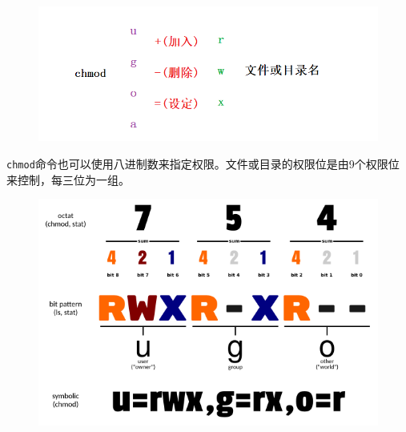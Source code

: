 \documentclass[12pt, openany, oneside]{book}
\begin{document}
\begin{figure}[H]
    \centering
    \includegraphics[scale=0.6]{img/C5/5-2/3.png}
\end{figure}

\begin{table}[H]
    \centering
    \caption{\lstinline|chmod|参数说明}
\end{table}

\lstinline|chmod|命令也可以使用八进制数来指定权限。文件或目录的权限位是由9个权限位来控制，每三位为一组。

\begin{figure}[H]
    \centering
    \includegraphics[scale=0.8]{img/C5/5-2/4.png}
\end{figure}
\end{document}
